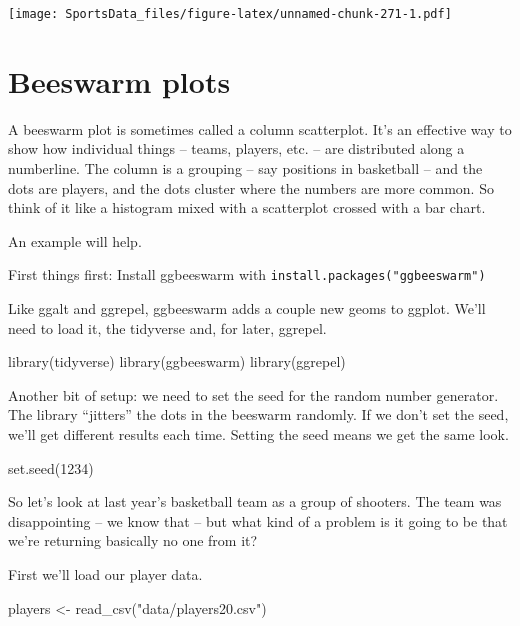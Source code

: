 \documentclass[
]{book}
\newenvironment{Shaded}{\begin{snugshade}}{\end{snugshade}}
\newcommand{\DecValTok}[1]{\textcolor[rgb]{0.00,0.00,0.81}{#1}}
\newcommand{\FunctionTok}[1]{\textcolor[rgb]{0.00,0.00,0.00}{#1}}
\newcommand{\NormalTok}[1]{#1}
\newcommand{\OtherTok}[1]{\textcolor[rgb]{0.56,0.35,0.01}{#1}}
\newcommand{\StringTok}[1]{\textcolor[rgb]{0.31,0.60,0.02}{#1}}
\begin{document}
\texttt{[image: SportsData\_files/figure-latex/unnamed-chunk-271-1.pdf]}

\hypertarget{beeswarm-plots}{%
\chapter{Beeswarm plots}\label{beeswarm-plots}}

A beeswarm plot is sometimes called a column scatterplot. It's an effective way to show how individual things -- teams, players, etc. -- are distributed along a numberline. The column is a grouping -- say positions in basketball -- and the dots are players, and the dots cluster where the numbers are more common. So think of it like a histogram mixed with a scatterplot crossed with a bar chart.

An example will help.

First things first: Install ggbeeswarm with \texttt{install.packages("ggbeeswarm")}

Like ggalt and ggrepel, ggbeeswarm adds a couple new geoms to ggplot. We'll need to load it, the tidyverse and, for later, ggrepel.

\begin{Shaded}
\begin{Highlighting}[]
\FunctionTok{library}\NormalTok{(tidyverse)}
\FunctionTok{library}\NormalTok{(ggbeeswarm)}
\FunctionTok{library}\NormalTok{(ggrepel)}
\end{Highlighting}
\end{Shaded}

Another bit of setup: we need to set the seed for the random number generator. The library ``jitters'' the dots in the beeswarm randomly. If we don't set the seed, we'll get different results each time. Setting the seed means we get the same look.

\begin{Shaded}
\begin{Highlighting}[]
\FunctionTok{set.seed}\NormalTok{(}\DecValTok{1234}\NormalTok{)}
\end{Highlighting}
\end{Shaded}

So let's look at last year's basketball team as a group of shooters. The team was disappointing -- we know that -- but what kind of a problem is it going to be that we're returning basically no one from it?

First we'll load our player data.

\begin{Shaded}
\begin{Highlighting}[]
\NormalTok{players }\OtherTok{\textless{}{-}} \FunctionTok{read\_csv}\NormalTok{(}\StringTok{"data/players20.csv"}\NormalTok{)}
\end{Highlighting}
\end{Shaded}
\end{document}
